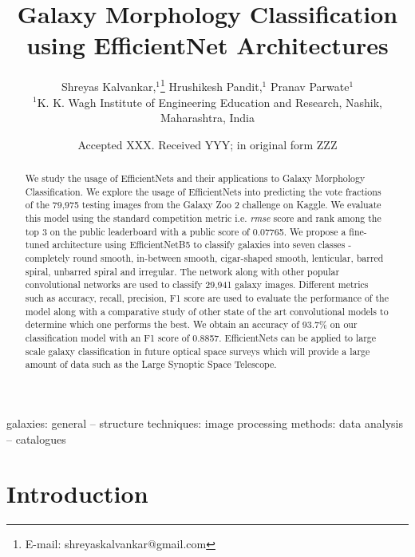 \documentclass[fleqn,usenatbib]{mnras}
\title[Galaxy Morphologies with EfficientNets]{Galaxy Morphology Classification using EfficientNet Architectures}
\author[S. Kalvankar et al.]{
Shreyas Kalvankar,$^{1}$\thanks{E-mail: shreyaskalvankar@gmail.com}
Hrushikesh Pandit,$^{1}$
Pranav Parwate$^{1}$
\\
$^{1}$K. K. Wagh Institute of Engineering Education and Research, Nashik, Maharashtra, India\\
}
\date{Accepted XXX. Received YYY; in original form ZZZ}
\begin{document}
\label{firstpage}
\pagerange{\pageref{firstpage}--\pageref{lastpage}}
\maketitle

\begin{abstract}
We study the usage of EfficientNets and their applications to Galaxy Morphology Classification. We explore the usage of EfficientNets into predicting the vote fractions of the 79,975 testing images from the Galaxy Zoo 2 challenge on Kaggle. We evaluate this model using the standard competition metric i.e. \textit{rmse} score and rank among the top 3 on the public leaderboard with a public score of 0.07765. We propose a fine-tuned architecture using EfficientNetB5 to classify galaxies into seven classes - completely round smooth, in-between smooth, cigar-shaped smooth, lenticular, barred spiral, unbarred spiral and irregular. The network along with other popular convolutional networks are used to classify 29,941 galaxy images. Different metrics such as accuracy, recall, precision, F1 score are used to evaluate the performance of the model along with a comparative study of other state of the art convolutional models to determine which one performs the best. We obtain an accuracy of 93.7\% on our classification model with an F1 score of 0.8857. EfficientNets can be applied to large scale galaxy classification in future optical space surveys which will provide a large amount of data such as the Large Synoptic Space Telescope. 
\end{abstract}

\begin{keywords}
galaxies: general -- structure techniques: image processing methods: data analysis -- catalogues
\end{keywords}



\section{Introduction}
\end{document}
